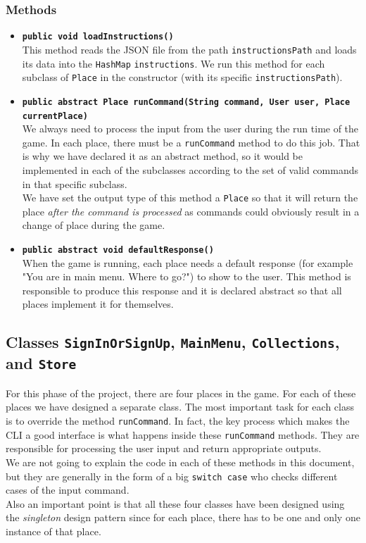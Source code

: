 \documentclass[a4paper]{article}
\begin{document}
\subsubsection{Methods}
\begin{itemize}
	\item \texttt{\textbf{public void loadInstructions()}}\\
	This method reads the JSON file from the path \texttt{instructionsPath} and loads its data into the \texttt{HashMap} \texttt{instructions}. We run this method for each subclass of \texttt{Place} in the constructor (with its specific \texttt{instructionsPath}).
	
	\item \texttt{\textbf{public abstract Place runCommand(String command, User user, Place currentPlace)}}\\
	We always need to process the input from the user during the run time of the game. In each place, there must be a \texttt{runCommand} method to do this job. That is why we have declared it as an abstract method, so it would be implemented in each of the subclasses according to the set of valid commands in that specific subclass.\\
	We have set the output type of this method a \texttt{Place} so that it will return the place \textit{after the command is processed} as commands could obviously result in a change of place during the game.
	
	\item \texttt{\textbf{public abstract void defaultResponse()}}\\
	When the game is running, each place needs a default response (for example "You are in main menu. Where to go?") to show to the user. This method is responsible to produce this response and it is declared abstract so that all places implement it for themselves.
\end{itemize}

\subsection{Classes \texttt{SignInOrSignUp}, \texttt{MainMenu}, \texttt{Collections}, and \texttt{Store}}
For this phase of the project, there are four places in the game. For each of these places we have designed a separate class. The most important task for each class is to override the method \texttt{runCommand}. In fact, the key process which makes the CLI a good interface is what happens inside these \texttt{runCommand} methods. They are responsible for processing the user input and return appropriate outputs.\\
We are not going to explain the code in each of these methods in this document, but they are generally in the form of a big \texttt{switch case} who checks different cases of the input command.\\
Also an important point is that all these four classes have been designed using the \textit{singleton} design pattern since for each place, there has to be one and only one instance of that place.
\end{document}
